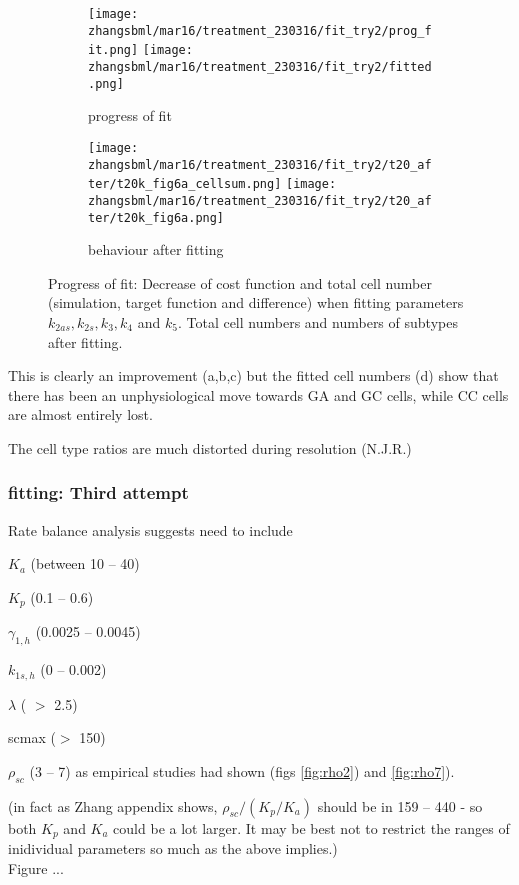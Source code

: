 \documentclass[a4paper,10pt]{report}
\newcommand{\psortbase}{/home/ngrs2/work/bsu/PSORT_Zuliani_Reynolds/}
\newcommand{\sbmlbase}{\psortbase/sbml-sh/}
\newcommand{\zhangsbml}{\sbmlbase/zhang_model}
\begin{document}
\begin{figure}[h!]
  \begin{subfigure}{\textwidth}
    \texttt{[image: \\zhangsbml/mar16/treatment\_230316/fit\_try2/prog\_fit.png]}
    \texttt{[image: \\zhangsbml/mar16/treatment\_230316/fit\_try2/fitted.png]}
    \caption{progress of fit}
  \end{subfigure}
  \begin{subfigure}{\textwidth}
    \texttt{[image: \\zhangsbml/mar16/treatment\_230316/fit\_try2/t20\_after/t20k\_fig6a\_cellsum.png]}
    \texttt{[image: \\zhangsbml/mar16/treatment\_230316/fit\_try2/t20\_after/t20k\_fig6a.png]}
    \caption{behaviour after fitting}
  \end{subfigure}

  \caption{Progress of fit: Decrease of cost function and total cell number (simulation, target function and difference) when fitting parameters $k_{2as},k_{2s},k_{3},k_{4}$ and $k_{5}$. Total cell numbers and numbers of subtypes after fitting.}
  \label{fig:fit_try2}
\end{figure}

This is clearly an improvement (a,b,c) but the fitted cell numbers (d) show that there has been an unphysiological move towards GA and GC cells, while CC cells are almost entirely lost. 


The cell type ratios are much distorted during resolution (N.J.R.) 

\subsubsection{fitting: Third attempt}

Rate balance analysis suggests need to include 
\begin{description} 
\item $K_a$ (between 10 -- 40)
\item $K_p$ (0.1 -- 0.6)
\item $\gamma_{1,h}$ (0.0025 -- 0.0045)
\item $k_{1s,h}$ (0 -- 0.002)
\item $\lambda$ ( $>$ 2.5)
\item scmax ($>$ 150)
\item $\rho_{sc}$ (3 -- 7) as empirical studies had shown (figs \ref{fig:rho2}) and  \ref{fig:rho7}). 
\end{description}
(in fact as Zhang appendix shows, $\rho_{sc}/(K_p/K_a)$ should be in 159 -- 440 -
so both $K_p$ and $K_a$ could be a lot larger. It may be best not to restrict the ranges of inidividual parameters so much as the above implies.) \\
Figure ... 
\end{document}
